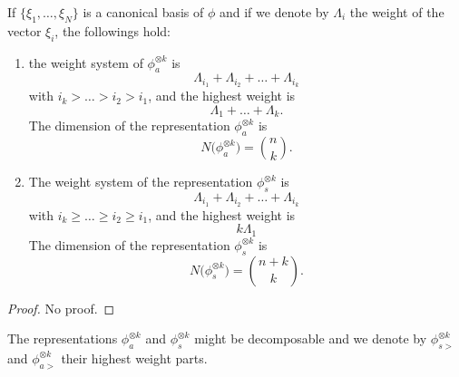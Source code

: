 \begin{proposition}
    If $\{ \xi_1,\ldots,\xi_N \}$ is a canonical basis of $\phi$ and if we denote by $\Lambda_i$ the weight of the vector $\xi_i$, the followings hold:
    \begin{enumerate}
        \item the weight system of $\phi^{\otimes k}_a$ is
            \begin{equation}
                \Lambda_{i_1}+\Lambda_{i_2}+\ldots+\Lambda_{i_k}
            \end{equation}
            with $i_k>\ldots>i_2>i_1$, and the highest weight is
            \begin{equation}
                \Lambda_1+\ldots+\Lambda_k.
            \end{equation}
            The dimension of the representation $\phi^{\otimes k}_a$ is
            \begin{equation}
                N\big( \phi^{\otimes k}_a \big)= {n\choose k}.
            \end{equation}

        \item The weight system of the representation $\phi^{\otimes k}_s$ is
            \begin{equation}
                \Lambda_{i_1}+\Lambda_{i_2}+\ldots+\Lambda_{i_k}
            \end{equation}
            with $i_k\geq \ldots\geq i_2\geq i_1$, and the highest weight is
            \begin{equation}
                k\Lambda_1
            \end{equation}
            The dimension of the representation $\phi^{\otimes k}_s$ is
            \begin{equation}
                N\big( \phi^{\otimes k}_s \big)= {n+k\choose k}.
            \end{equation}
    \end{enumerate}
\end{proposition}

\begin{proof}
    No proof.
\end{proof}
The representations $\phi^{\otimes k}_a$ and $\phi^{\otimes k}_s$ might be decomposable and we denote by $\phi^{\otimes k}_{s>}$ and $\phi^{\otimes k}_{a>}$ their highest weight parts.


